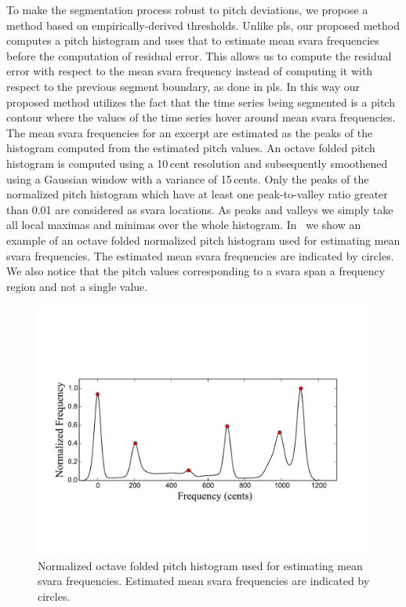 {To make the segmentation process robust to pitch deviations, we propose a method based on empirically-derived thresholds. Unlike \gls{pls}, our proposed method computes a pitch histogram and uses that to estimate mean \gls{svara} frequencies before the computation of residual error. This allows us to compute the residual error with respect to the mean \gls{svara} frequency instead of computing it with respect to the previous segment boundary, as done in \gls{pls}. In this way our proposed method utilizes the fact that the time series being segmented is a pitch contour where the values of the time series hover around mean \gls{svara} frequencies. The mean \gls{svara} frequencies for an excerpt are estimated as the peaks of the histogram computed from the estimated pitch values. An octave folded pitch histogram is computed using a 10\,cent resolution and subsequently smoothened using a Gaussian window with a variance of 15\,cents. Only the peaks of the normalized pitch histogram which have at least one peak-to-valley ratio greater than 0.01 are considered as \gls{svara} locations. As peaks and valleys we simply take all local maximas and minimas over the whole histogram. In~ we show an example of an octave folded normalized pitch histogram used for estimating mean \gls{svara} frequencies. The estimated mean \gls{svara} frequencies are indicated by circles. We also notice that the pitch values corresponding to a \gls{svara} span a frequency region and not a single value.


\begin{figure}
	\begin{center}
		\includegraphics[width=\figSizeNinety]{ch05_preprocessing/figures/swarOnHistogramForNyasSegmentation.pdf}
	\end{center}
	\caption[Example of a normalized octave folded pitch histogram]{Normalized octave folded pitch histogram used for estimating mean \gls{svara} frequencies. Estimated mean \gls{svara} frequencies are indicated by circles.}
	\label{fig:pitch_histogram_nyas_segmentation}
\end{figure}

}
